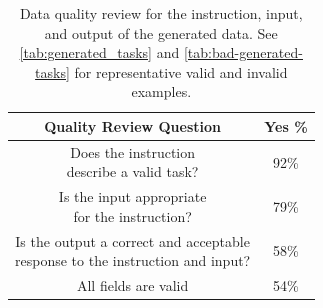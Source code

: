 

\begin{table}[h]
\small
  \setlength\doublerulesep{\arrayrulewidth} %
 \renewcommand\cellset{\renewcommand\arraystretch{0.5}}
\centering
\begin{tabular}{|c|c|}
\toprule
Quality Review Question                                   & Yes \% \\ 
\midrule \midrule
\makecell[c]{Does the instruction \\ describe a valid task? }               &   92\%  \\ \midrule
\makecell[c]{Is the input appropriate \\ for the instruction?}               &   79\% \\ \midrule
\makecell[c]{Is the output a correct and acceptable \\ response to the instruction and input?} &   58\%  \\ \midrule
\midrule
All fields are valid                                        &  54\%   \\ \bottomrule
\end{tabular}
\caption{Data quality review for the instruction, input, and output of the generated data. See \autoref{tab:generated_tasks} and \autoref{tab:bad-generated-tasks} for representative valid and invalid examples.
}
\label{tab:data_quality_eval}
\end{table}
